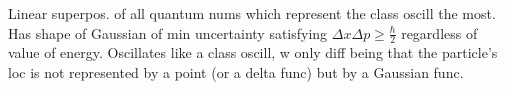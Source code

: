 \tiny
Linear superpos. of all quantum nums which represent the class oscill the most. Has shape of Gaussian of min uncertainty satisfying $\Delta x \Delta p \geq \frac{\hbar}{2}$ regardless of value of energy. Oscillates like a class oscill, w only diff being that the particle's loc is not represented by a point (or a delta func) but by a Gaussian func.
\scriptsize






